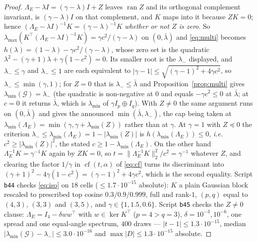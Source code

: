 \documentclass[11pt]{article}
\theoremstyle{remark}
\newcommand{\Gr}{\mathcal{G}}
\newcommand{\Le}{\Lambda_E}
\begin{document}
\begin{proof}
$\Le-\lambda I=(\gamma-\lambda)I+Z$ leaves $\operatorname{ran}Z$ and its orthogonal complement
invariant, is $(\gamma-\lambda)I$ on that complement, and $K$ maps into it because $ZK=0$; hence
$(\Le-\lambda I)^{-1}K=(\gamma-\lambda)^{-1}K$ \emph{whether or not $Z$ is zero}. So
$\lambda_{\max}(K^{\top}(\Le-\lambda I)^{-1}K)=\gamma c^{2}/(\gamma-\lambda)$ on $(0,\bar\lambda)$ and
\eqref{eq:multi} becomes $h(\lambda)=(1-\lambda)-\gamma c^{2}/(\gamma-\lambda)$, whose zero set is
the quadratic $\lambda^{2}-(\gamma+1)\lambda+\gamma(1-c^{2})=0$. Its smaller root is the $\lambda_-$
displayed, and $\lambda_-\le\gamma$ and $\lambda_-\le1$ are each equivalent to
$|\gamma-1|\le\sqrt{(\gamma-1)^{2}+4\gamma c^{2}}$, so $\lambda_-\le\min(\gamma,1)$; for $Z=0$ that is
$\lambda_-\le\bar\lambda$ and Proposition~\ref{prop:multi} gives $\lambda_{\min}(\Gr)=\lambda_-$
(the quadratic is non-negative at $0$ and equals $-\gamma c^{2}\le0$ at $\bar\lambda$; at $c=0$ it
returns $\bar\lambda$, which is $\lambda_{\min}$ of $\gamma I_p\oplus I_q$). With $Z\ne0$ the same
argument runs on $(0,\bar\lambda)$ and gives the announced $\min(\bar\lambda,\lambda_-)$, the cap
being taken at $\lambda_{\min}(\Le)=\min(\gamma,\gamma+\lambda_{\min}(Z))$ rather than at $\gamma$.
At $\gamma=1$ with $Z\preceq0$ the criterion $\lambda_-\le\lambda_{\min}(\Le)=1-|\lambda_{\min}(Z)|$
is $h(\lambda_{\min}(\Le))\le0$, \emph{i.e.}\ $c^{2}\ge|\lambda_{\min}(Z)|^{2}$, the stated
$c\ge1-\lambda_{\min}(\Le)$.
On the other hand $\Le^{-1}K=\gamma^{-1}K$ again by $ZK=0$, so
$t=\|\Le^{-1}K\|_{2}^{2}/c^{2}=\gamma^{-1}$ whatever $Z$, and clearing the factor $1/\gamma$ in
$\operatorname{cf}(t,\alpha)$ of \eqref{eq:cf} turns its discriminant into
$(\gamma+1)^{2}-4\gamma(1-c^{2})=(\gamma-1)^{2}+4\gamma c^{2}$, which is the second equality.
Script \texttt{b44} checks \eqref{eq:iso} on $18$ cells ($\le1.7\cdot10^{-15}$ absolute): $K$ a plain
Gaussian block rescaled to prescribed top cosine $0.3/0.9/0.999$, full and rank-$1$, $(p,q)$ equal to
$(4,3)$, $(3,3)$ and $(3,5)$, and $\gamma\in\{1,1.5,0.6\}$. Script \texttt{b45} checks the $Z\ne0$
clause: $\Le=I_4-\delta ww^{\top}$ with $w\in\ker K^{\top}$ ($p=4>q=3$), $\delta=10^{-3},10^{-6}$,
one spread and one equal-angle spectrum, $400$ draws --- $|t-1|\le1.3\cdot10^{-15}$, median
$|\lambda_{\min}(\Gr)-\lambda_-|\le3.0\cdot10^{-16}$ and $\max|D|\le1.3\cdot10^{-15}$ absolute.
\end{proof}
\end{document}
